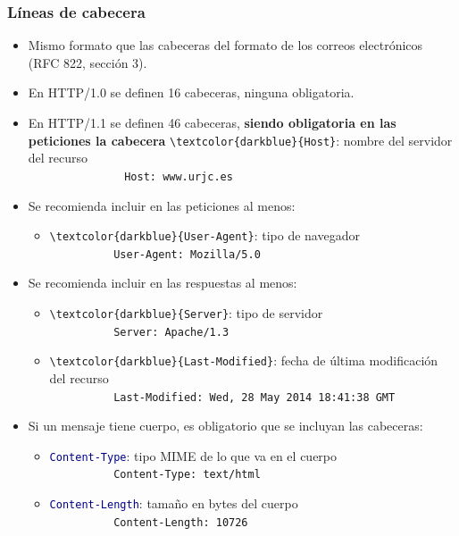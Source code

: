 \documentclass[hyperref={pdfpagelabels=true},ucs]{beamer}
\begin{document}


\begin{frame}[fragile,shrink=18]
\frametitle{Líneas de cabecera}


\begin{itemize}
\item Mismo formato que las cabeceras del formato de los correos
  electrónicos (RFC 822, sección 3).

\item En HTTP/1.0 se definen 16 cabeceras, ninguna obligatoria.

\item En HTTP/1.1 se definen 46 cabeceras, \textbf{siendo obligatoria
    en las peticiones la cabecera} \Verb|\textcolor{darkblue}{Host}|:
  nombre del servidor del recurso\\
    {\scriptsize \Verb|               Host: www.urjc.es|}

\item Se recomienda incluir en las peticiones al menos: 
  \begin{itemize}
  \item \Verb|\textcolor{darkblue}{User-Agent}|: tipo de navegador\\
    {\scriptsize \Verb|          User-Agent: Mozilla/5.0|}
  \end{itemize}

\item Se recomienda incluir en las respuestas al menos:
  \begin{itemize}
  \item \Verb|\textcolor{darkblue}{Server}|: tipo de servidor\\
    {\scriptsize \Verb|          Server: Apache/1.3|}
  \item \Verb|\textcolor{darkblue}{Last-Modified}|: fecha de última
    modificación del recurso\\
    {\scriptsize \Verb|          Last-Modified: Wed, 28 May 2014 18:41:38 GMT|}
  \end{itemize}

\item Si un mensaje tiene cuerpo, es obligatorio que se incluyan las
  cabeceras:
  \begin{itemize}
  \item \textcolor{darkblue}{\Verb|Content-Type|}: tipo MIME de lo que
    va en el cuerpo\\
    {\scriptsize \Verb|          Content-Type: text/html|}
  \item \textcolor{darkblue}{\Verb|Content-Length|}: tamaño en bytes
      del cuerpo\\
    {\scriptsize \Verb|          Content-Length: 10726|}
  \end{itemize}

\end{itemize}
\end{frame}
\end{document}
